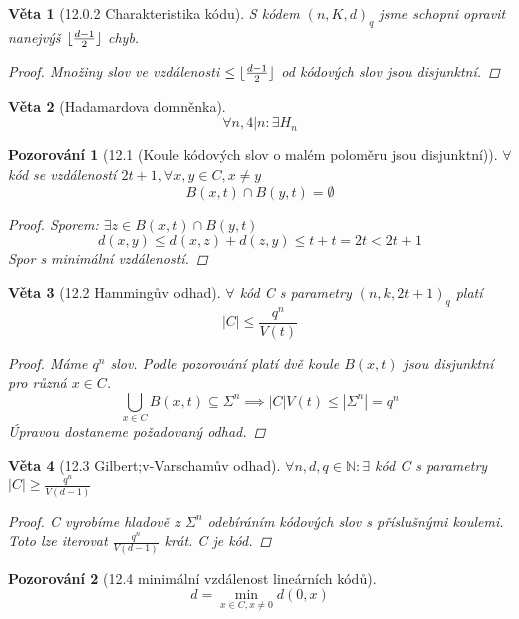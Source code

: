 \documentclass[10pt,a4paper]{article}
\theoremstyle{plain}
\newtheorem*{veta}{Věta}
\newtheorem*{pozorovani}{Pozorování}
\begin{document}
\begin{veta}[12.0.2 Charakteristika kódu]
S kódem $(n,K,d)_q$ jsme schopni opravit nanejvýš $\lfloor \frac{d-1}2 \rfloor$ chyb.
\begin{proof}
Množiny slov ve vzdálenosti $\leq \lfloor \frac{d-1}2 \rfloor$ od kódových slov jsou disjunktní.
\end{proof}
\end{veta}

\begin{veta}[Hadamardova domněnka]
\[\forall n, 4|n: \exists H_n \]
\end{veta}

\begin{pozorovani}[12.1 (Koule kódových slov o malém poloměru jsou disjunktní)] 
$\forall$ kód se vzdáleností $2t+1, \forall x,y \in C, x \neq y$
\[ B(x,t) \cap B(y,t) = \emptyset 
\]
\begin{proof}
Sporem: $ \exists z \in  B(x,t) \cap B(y,t) $
\[ d(x,y) \leq d(x,z)+d(z,y) \leq t + t = 2t < 2t+1 \]
Spor s minimální vzdáleností.
\end{proof}
\end{pozorovani}

\begin{veta}[12.2 Hammingův odhad]
$\forall$ kód C s parametry $(n,k,2t+1)_q$ platí \[ |C| \leq \frac{q^n}{V(t)} \]
\begin{proof}
Máme $q^n$ slov. Podle pozorování platí dvě koule $B(x,t)$ jsou disjunktní pro různá $x \in C$. 
\[ \bigcup_{x \in C} B(x,t) \subseteq \Sigma^n \implies |C|V(t) \leq |\Sigma^n| = q^n \]
Úpravou dostaneme požadovaný odhad.
\end{proof}
\end{veta}

\begin{veta}[12.3 Gilbert;v-Varschamův odhad]
$\forall n,d,q \in \mathbb{N}: \exists$ kód C s parametry $|C| \geq \frac{q^n}{V(d-1)}$
\begin{proof}
C vyrobíme hladově z $\Sigma^n$ odebíráním kódových slov s příslušnými koulemi. Toto lze iterovat $ \frac{q^n}{V(d-1)}$ krát.
C je kód.
\end{proof}
\end{veta}

\begin{pozorovani}[12.4 minimální vzdálenost lineárních kódů] 
\[d = \min_{x \in C, x \neq 0} d(0,x) \]
\end{pozorovani}
\end{document}
